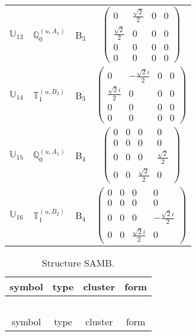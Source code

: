 \documentclass[fleqn,10pt,landscape]{article}
\begin{document}
\begin{itemize}
\begin{center}
\begin{longtable}{c|c|c|c}
$ \mathbb{U}_{13} $ & $\mathbb{Q}_{0}^{(u,A_{1})}$ & B$_{3}$ & $\begin{pmatrix} 0 & \frac{\sqrt{2}}{2} & 0 & 0 \\ \frac{\sqrt{2}}{2} & 0 & 0 & 0 \\ 0 & 0 & 0 & 0 \\ 0 & 0 & 0 & 0 \end{pmatrix}$ \\
$ \mathbb{U}_{14} $ & $\mathbb{T}_{1}^{(u,B_{2})}$ & B$_{3}$ & $\begin{pmatrix} 0 & - \frac{\sqrt{2} i}{2} & 0 & 0 \\ \frac{\sqrt{2} i}{2} & 0 & 0 & 0 \\ 0 & 0 & 0 & 0 \\ 0 & 0 & 0 & 0 \end{pmatrix}$ \\ \hline
$ \mathbb{U}_{15} $ & $\mathbb{Q}_{0}^{(u,A_{1})}$ & B$_{4}$ & $\begin{pmatrix} 0 & 0 & 0 & 0 \\ 0 & 0 & 0 & 0 \\ 0 & 0 & 0 & \frac{\sqrt{2}}{2} \\ 0 & 0 & \frac{\sqrt{2}}{2} & 0 \end{pmatrix}$ \\
$ \mathbb{U}_{16} $ & $\mathbb{T}_{1}^{(u,B_{2})}$ & B$_{4}$ & $\begin{pmatrix} 0 & 0 & 0 & 0 \\ 0 & 0 & 0 & 0 \\ 0 & 0 & 0 & - \frac{\sqrt{2} i}{2} \\ 0 & 0 & \frac{\sqrt{2} i}{2} & 0 \end{pmatrix}$ \\
\end{longtable}
\end{center}
\begin{center}
\renewcommand{\arraystretch}{1.3}
\begin{longtable}{c|c|c|c}
\caption{Structure SAMB.}
 \\
 \hline \hline
symbol & type & cluster & form \\ \hline \endfirsthead

\multicolumn{3}{l}{\tablename\ \thetable{}} \\
 \hline \hline
symbol & type & cluster & form \\ \hline \endhead


\end{longtable}
\end{center}
\end{itemize}
\end{document}
